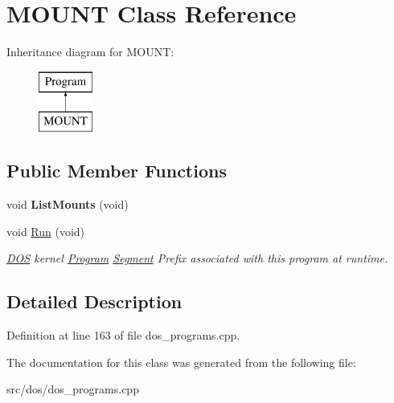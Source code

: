 \hypertarget{classMOUNT}{\section{M\-O\-U\-N\-T Class Reference}
\label{classMOUNT}
}
Inheritance diagram for M\-O\-U\-N\-T\-:\begin{figure}[H]
\begin{center}
\leavevmode
\includegraphics[height=2.000000cm]{classMOUNT}
\end{center}
\end{figure}
\subsection*{Public Member Functions}
\begin{DoxyCompactItemize}
\item 
\hypertarget{classMOUNT_a162c6c15860f047f90e4a632cd80f769}{void {\bfseries List\-Mounts} (void)}\label{classMOUNT_a162c6c15860f047f90e4a632cd80f769}

\item 
\hypertarget{classMOUNT_aecbba89c92ac2fbd78a929ed04818d58}{void \hyperlink{classMOUNT_aecbba89c92ac2fbd78a929ed04818d58}{Run} (void)}\label{classMOUNT_aecbba89c92ac2fbd78a929ed04818d58}

\begin{DoxyCompactList}\small\item\em \hyperlink{classDOS}{D\-O\-S} kernel \hyperlink{classProgram}{Program} \hyperlink{structSegment}{Segment} Prefix associated with this program at runtime. \end{DoxyCompactList}\end{DoxyCompactItemize}


\subsection{Detailed Description}


Definition at line 163 of file dos\-\_\-programs.\-cpp.



The documentation for this class was generated from the following file\-:\begin{DoxyCompactItemize}
\item 
src/dos/dos\-\_\-programs.\-cpp\end{DoxyCompactItemize}
